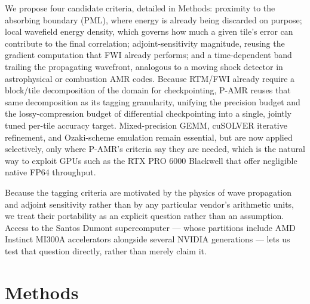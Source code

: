 \documentclass[12pt,a4paper]{article}
\newcommand{\pamr}{P\nobreakdash-AMR}
\begin{document}
We propose four candidate criteria, detailed in Methods: proximity to the
absorbing boundary (PML), where energy is already being discarded on purpose;
local wavefield energy density, which governs how much a given tile's error can
contribute to the final correlation; adjoint-sensitivity magnitude, reusing the
gradient computation that FWI already performs; and a time-dependent band
trailing the propagating wavefront, analogous to a moving shock detector in
astrophysical or combustion AMR codes. Because RTM/FWI already require a
block/tile decomposition of the domain for checkpointing, \pamr{} reuses that
same decomposition as its tagging granularity, unifying the precision budget and
the lossy-compression budget of differential checkpointing into a single, jointly
tuned per-tile accuracy target. Mixed-precision GEMM, cuSOLVER iterative
refinement, and Ozaki-scheme emulation remain essential, but are now applied
selectively, only where \pamr{}'s criteria say they are needed, which is the
natural way to exploit GPUs such as the RTX PRO 6000 Blackwell that offer
negligible native FP64 throughput.

Because the tagging criteria are motivated by the physics of wave propagation and
adjoint sensitivity rather than by any particular vendor's arithmetic units, we
treat their portability as an explicit question rather than an assumption. Access
to the Santos Dumont supercomputer --- whose partitions include AMD Instinct
MI300A accelerators alongside several NVIDIA generations --- lets us test that
question directly, rather than merely claim it.

\fi

\iffalse

\section{Methods}
\end{document}
